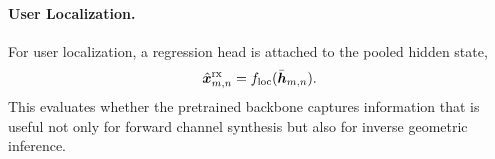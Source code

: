 \paragraph{User Localization.}
For user localization, a regression head is attached to the pooled hidden state,
\begin{equation}
\hat{\boldsymbol{x}}^{\mathrm{rx}}_{m,n} = f_{\mathrm{loc}}(\bar{\boldsymbol{h}}_{m,n}).
\label{eq:localization}
\end{equation}
This evaluates whether the pretrained backbone captures information that is useful not only for forward channel synthesis but also for inverse geometric inference.